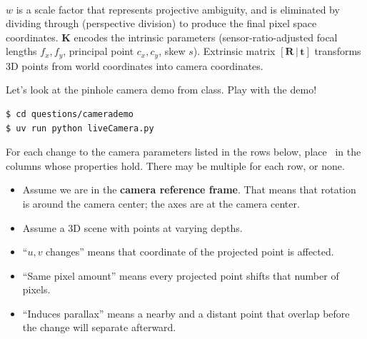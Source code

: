\documentclass{csci1430}
\begin{document}
\begin{question}[points=8,drawbox=false]
\begin{equation}
\begin{aligned}
\end{aligned}
\end{equation}
%
$w$ is a scale factor that represents projective ambiguity, and is eliminated by dividing through (perspective division) to produce the final pixel space coordinates. $\mathbf{K}$ encodes the intrinsic parameters (sensor-ratio-adjusted focal lengths $f_x, f_y$, principal point $c_x, c_y$, skew $s$). Extrinsic matrix $[\mathbf{R}\,|\,\mathbf{t}]$ transforms 3D points from world coordinates into camera coordinates.
\end{question}

\pagebreak

\begin{subquestion}[points=5]
Let's look at the pinhole camera demo from class. Play with the demo!
\begin{verbatim}
$ cd questions/camerademo
$ uv run python liveCamera.py
\end{verbatim}

For each change to the camera parameters listed in the rows below, place \filled~in the columns whose properties hold. There may be multiple for each row, or none.

\begin{itemize}[leftmargin=12pt]
    \item Assume we are in the \textbf{camera reference frame}. That means that rotation is around the camera center; the axes are at the camera center.
    \item Assume a 3D scene with points at varying depths.
    \item ``$u,v$ changes'' means that coordinate of the projected point is affected.
    \item ``Same pixel amount'' means every projected point shifts that number of pixels.
    \item ``Induces parallax'' means a nearby and a distant point that overlap before the change will separate afterward.
\end{itemize}
\end{subquestion}
\end{document}
